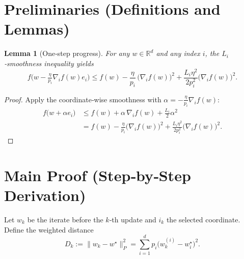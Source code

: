 \documentclass[11pt]{article}
\newtheorem{lemma}{Lemma}
\begin{document}
\newpage
\section*{Preliminaries (Definitions and Lemmas)}
\begin{lemma}[One‑step progress]\label{lem:one-step}
For any $w\in\mathbb{R}^{d}$ and any index $i$, the $L_i$‑smoothness inequality yields
\[
f\!\big(w-\tfrac{\eta}{p_i}\nabla_i f(w)e_i\big)
\le
f(w)-\frac{\eta}{p_i}\,\big(\nabla_i f(w)\big)^{2}
+\frac{L_i\eta^{2}}{2p_i^{2}}\big(\nabla_i f(w)\big)^{2}.
\]
\end{lemma}
\begin{proof}
Apply the coordinate‑wise smoothness with $\alpha=-\frac{\eta}{p_i}\nabla_i f(w)$:
\[
\begin{aligned}
f\big(w+\alpha e_i\big)
&\le f(w)+\alpha\,\nabla_i f(w)+\frac{L_i}{2}\alpha^{2}\\
&=f(w)-\frac{\eta}{p_i}\big(\nabla_i f(w)\big)^{2}
+\frac{L_i\eta^{2}}{2p_i^{2}}\big(\nabla_i f(w)\big)^{2}.
\end{aligned}
\]
\end{proof}

\section*{Main Proof (Step‑by‑Step Derivation)}
Let $w_k$ be the iterate before the $k$‑th update and $i_k$ the selected coordinate.
Define the weighted distance
\[
D_k:=\|w_k-w^{\star}\|_{P}^{2}
   =\sum_{i=1}^{d}p_i\big(w_k^{(i)}-w^{\star}_i\big)^{2}.
\]
\end{document}
